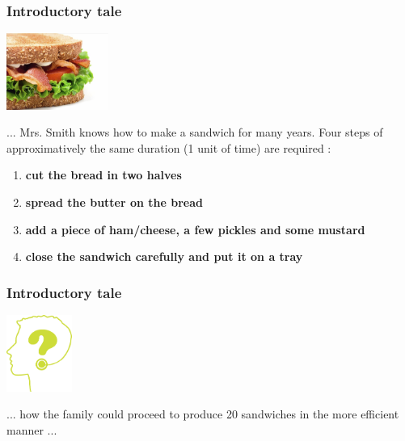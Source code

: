 \begin{frame}[containsverbatim]
\frametitle{Introductory tale}
\begin{center}
        {\includegraphics[height=2.5cm]{Day0/images/sandwich.jpg}}
\end{center}
\begin{center}
... Mrs. Smith knows how to make a sandwich for many years. Four steps of approximatively the same duration (1 unit of time) are required :
\begin{enumerate}
	\item{\textbf{cut the bread in two halves}}
	\item{\textbf{spread the butter on the bread}}
	\item{\textbf{add a piece of ham/cheese, a few pickles and some mustard }}
	\item{\textbf{close the sandwich carefully and put it on a tray}}
\end{enumerate}
\end{center}

\end{frame}


\begin{frame}[containsverbatim]
\frametitle{Introductory tale}
\begin{center}
        {\includegraphics[height=2.5cm]{Day0/images/interrogation.png}}
\end{center}
\begin{center}
... how the family could proceed to produce 20 sandwiches in the more efficient manner ...
\end{center}

\end{frame}



